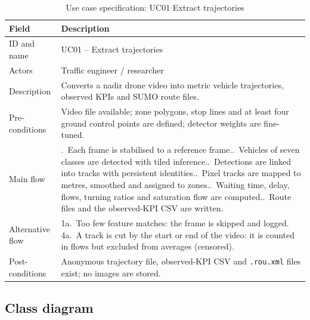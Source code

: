 \begin{table}[htbp]
\centering
\caption{Use case specification: UC01 Extract trajectories}
\label{tab:srs-uc-extract}
\small
\renewcommand{\arraystretch}{1.15}
\begin{tabularx}{\textwidth}{@{}>{\raggedright\arraybackslash}p{2.8cm}>{\raggedright\arraybackslash}X@{}}
\toprule
\textbf{Field} & \textbf{Description}\\
\midrule
ID and name & UC01 -- Extract trajectories\\
Actors & Traffic engineer / researcher\\
Description & Converts a nadir drone video into metric vehicle trajectories, observed KPIs and SUMO route files.\\
Pre-conditions & Video file available; zone polygons, stop lines and at least four ground control points are defined; detector weights are fine-tuned.\\
Main flow & 1.~Each frame is stabilised to a reference frame.\newline
2.~Vehicles of seven classes are detected with tiled inference.\newline
3.~Detections are linked into tracks with persistent identities.\newline
4.~Pixel tracks are mapped to metres, smoothed and assigned to zones.\newline
5.~Waiting time, delay, flows, turning ratios and saturation flow are computed.\newline
6.~Route files and the observed-KPI CSV are written.\\
Alternative flow & 1a.~Too few feature matches: the frame is skipped and logged.\newline
4a.~A track is cut by the start or end of the video: it is counted in flows but excluded from averages (censored).\\
Post-conditions & Anonymous trajectory file, observed-KPI CSV and \texttt{.rou.xml} files exist; no images are stored.\\
\bottomrule
\end{tabularx}
\end{table}

\subsection{Class diagram}\label{sec:srs-class}

